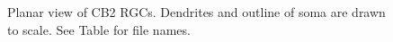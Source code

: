 \documentclass{article}
\begin{document}
\pagestyle{empty}



\newcommand{\beginsupplement}{%
  \setcounter{table}{0}
  \renewcommand{\thetable}{S\arabic{table}}%
  \setcounter{figure}{0}
  \renewcommand{\thefigure}{S\arabic{figure}}%
}

\beginsupplement

%
%


\begin{figure}
  \centering
  \caption{Planar view of CB2 RGCs. Dendrites and outline of soma are
    drawn to scale. See Table \protect{\ref{CB2filenames}} for file
    names. \label{CB2planar}}
\end{figure}
\end{document}
